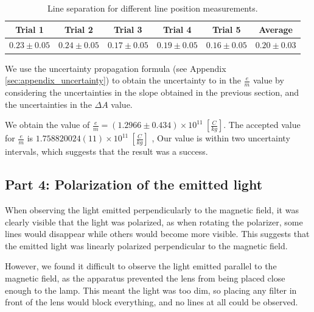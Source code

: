 \def\lineUncertainty{0.05}
\begin{table}[h]
    \centering
    \begin{tabular}{|c|c|c|c|c|c|}
        \hline
        Trial 1                     & Trial 2                     & Trial 3                     & Trial 4                     & Trial 5                     & Average         \\
        \hline
        $0.23 \pm \lineUncertainty$ & $0.24 \pm \lineUncertainty$ & $0.17 \pm \lineUncertainty$ & $0.19 \pm \lineUncertainty$ & $0.16 \pm \lineUncertainty$ & $0.20 \pm 0.03$ \\
        \hline
    \end{tabular}
    \caption{Line separation for different line position measurements.}
    \label{table:line_separation}
\end{table}



We use the uncertainty propagation formula (see Appendix \ref{sec:appendix_uncertainty}) to obtain the uncertainty to in the $\frac{e}{m}$ value by considering the uncertainties in the slope obtained in the previous section, and the uncertainties in the $\Delta A$ value.

We obtain the value of $\frac{e}{m} = (1.2966\pm 0.434) \times 10^{11}~[\frac{C}{kg}]$. The accepted value for $\frac{e}{m}$ is $1.758820024(11) \times 10^{11}~[\frac{C}{kg}]$ \cite{MeasuringIOPSpark}, Our value is within two uncertainty intervals, which suggests that the result was a success.

\subsection{Part 4: Polarization of the emitted light}
When observing the light emitted perpendicularly to the magnetic field, it was clearly visible that the light was polarized, as when rotating the polarizer, some lines would disappear while others would become more visible.
This suggests that the emitted light was linearly polarized perpendicular to the magnetic field.

However, we found it difficult to observe the light emitted parallel to the
magnetic field, as the apparatus prevented the lens from being placed close enough
to the lamp. This meant the light was too dim, so placing any filter in front of the lens would block everything, and no
lines at all could be observed.